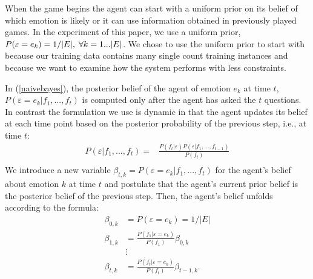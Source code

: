 \documentclass[a4paper]{article}
\begin{document}




When the game begins the agent can start with a uniform prior on its belief of
which emotion is likely or it can use information obtained in previously
played games.  In the experiment of this paper, we use a uniform prior,
$P(\varepsilon=e_k) =1/|E|, \thickspace \forall k=1...|E|$.  We chose to use
the uniform prior to start with because our training data contains many single
count training instances and because we want to examine how the system
performs with less constraints.  

In (\ref{naivebayes}), the posterior belief of the agent of emotion $e_k$ at time $t$, $P(\varepsilon=e_k | f_1,...,f_t)$ is computed only after the agent has asked the $t$ questions.  In
contrast the formulation we use is dynamic in that the agent updates its
belief at each time point based on the posterior probability of the previous
step, i.e., at time $t$:
\begin{equation}\label{adaptive}
\begin{aligned}
P(\varepsilon|f_1,...,f_t) =&  \frac{  P( f_t|\varepsilon)  P(\varepsilon|f_1,...,f_{t-1})}{P(f_t)} \\
\end{aligned}
\end{equation}
We introduce a new variable $\beta_{t,k}=P(\varepsilon=e_k | f_1,...,f_t)$
for the agent's belief about emotion $k$ at time $t$ and postulate that the
agent's current prior belief is the posterior belief of the previous
step. Then, the agent's belief unfolds according to the formula:
\begin{equation}\label{adaptive2}
\begin{aligned}
\beta_{0,k} &= P(\varepsilon=e_k) = 1/|E| \\
\beta_{1,k} &= \frac{P(f_1 | \varepsilon=e_k)}{P(f_1)} \beta_{0,k} \\
& \vdots \\
\beta_{t,k} &=  \frac{ P(f_t|\varepsilon=e_k)}{ P(f_t)} \beta_{t-1,k} .
\end{aligned}
\end{equation}
\end{document}
